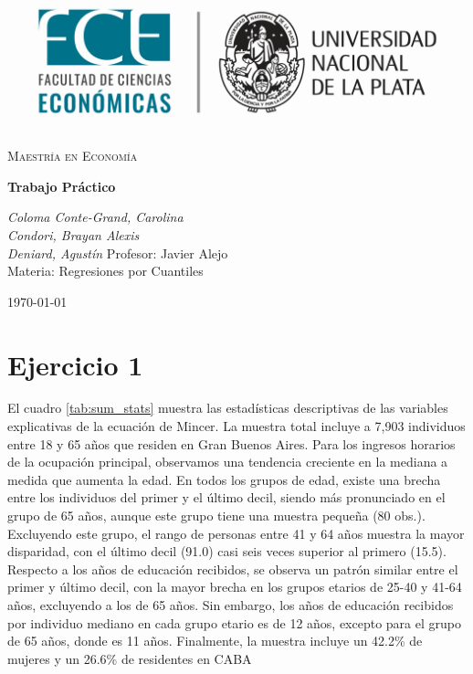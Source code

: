 \documentclass[12pt]{article}
\begin{document}
   


\begin{titlepage}
    \centering
    \vspace*{2cm}
    \includegraphics[width=1\textwidth]{logo.png} 
    
    \vspace{2cm}
    {\scshape\LARGE Maestría en Economía} \\
    
    \vspace{0.5cm}
    {\huge\bfseries
    Trabajo Práctico\par}
    \vspace{2cm}
    {\Large\itshape Coloma Conte-Grand, Carolina} \\
    
    {\Large\itshape Condori, Brayan Alexis} \\
    
    {\Large\itshape Deniard, Agustín}
    \vfill
    {\large Profesor: Javier Alejo} \\
    {\large Materia: Regresiones por Cuantiles}

    \vfill

    {\large \today\par}
\end{titlepage}

\justify 

\section*{Ejercicio 1}


El cuadro \ref{tab:sum_stats} muestra las estadísticas descriptivas de las variables explicativas de la ecuación de Mincer. La muestra total incluye a 7,903 individuos entre 18 y 65 años que residen en Gran Buenos Aires. Para los ingresos horarios de la ocupación principal, observamos una tendencia creciente en la mediana a medida que aumenta la edad. En todos los grupos de edad, existe una brecha entre los individuos del primer y el último decil, siendo más pronunciado en el grupo de 65 años, aunque este grupo tiene una muestra pequeña (80 obs.). Excluyendo este grupo, el rango de personas entre 41 y 64 años muestra la mayor disparidad, con el último decil (91.0) casi seis veces superior al primero (15.5). Respecto a los años de educación recibidos, se observa un patrón similar entre el primer y último decil, con la mayor brecha en los grupos etarios de 25-40 y 41-64 años, excluyendo a los de 65 años. Sin embargo, los años de educación recibidos por individuo mediano en cada grupo etario es de 12 años, excepto para el grupo de 65 años, donde es 11 años. Finalmente, la muestra incluye un 42.2\% de mujeres y un 26.6\% de residentes en CABA
\end{document}

